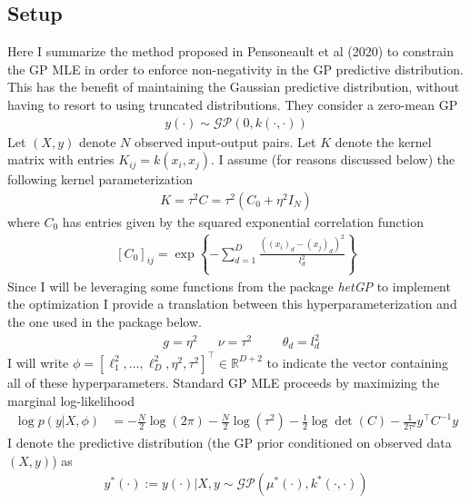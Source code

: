 \documentclass[12pt]{article}
\newcommand{\R}{\mathbb{R}}
\begin{document}
\subsection{Setup}
Here I summarize the method proposed in Pensoneault et al (2020) to constrain the GP MLE in order to enforce non-negativity in the GP predictive 
distribution. This has the benefit of maintaining the Gaussian predictive distribution, without having to resort to using truncated distributions. 
They consider a zero-mean GP 
\begin{align*}
y(\cdot) \sim \mathcal{GP}(0, k(\cdot, \cdot)) 
\end{align*}
Let $(X, y)$ denote $N$ observed input-output pairs. Let $K$ denote the kernel matrix with entries $K_{ij} = k(x_i, x_j)$. 
I assume (for reasons discussed below) the following kernel parameterization 
\begin{align*}
K = \tau^2 C = \tau^2 \left(C_0 + \eta^2 I_N \right)
\end{align*}
where $C_0$ has entries given by the squared exponential correlation function 
\begin{align*}
\left[C_0\right]_{ij} = \exp\left\{-\sum_{d = 1}^{D} \frac{((x_i)_d - (x_j)_d)^2}{l^2_d} \right\}
\end{align*}
Since I will be leveraging some functions from the package \textit{hetGP} to implement the optimization I provide a translation between 
this hyperparameterization and the one used in the package below. 
\begin{align*}
&g = \eta^2 &&\nu = \tau^2 &&&\theta_d = l_d^2
\end{align*}
I will write $\phi = \left[\ell_1^2, \dots, \ell_D^2, \eta^2, \tau^2 \right]^\top \in \R^{D+2}$ to indicate the vector containing all of these hyperparameters. 
Standard GP MLE proceeds by maximizing the marginal log-likelihood
\begin{align*}
\log p(y|X, \phi) &= -\frac{N}{2}  \log(2\pi) - \frac{N}{2}\log(\tau^2) - \frac{1}{2} \log \det(C) - \frac{1}{2\tau^2} y^\top C^{-1}y
\end{align*}
I denote the predictive distribution (the GP prior conditioned on observed data $(X, y)$) as 
\begin{align*}
y^*(\cdot) := y(\cdot)|X, y \sim \mathcal{GP}(\mu^*(\cdot), k^*(\cdot, \cdot)) 
\end{align*}
\end{document}
